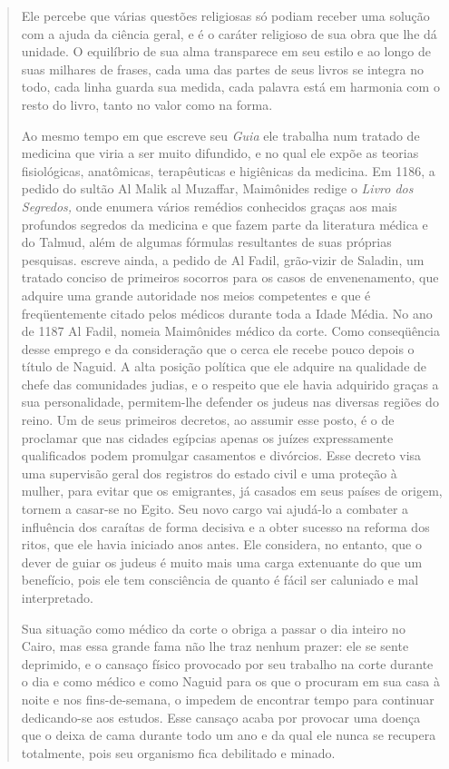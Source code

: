 \begin{quote}
Ele percebe que várias questões religiosas só podiam receber uma solução
com a ajuda da ciência geral, e é o caráter religioso de sua obra que
lhe dá unidade. O equilíbrio de sua alma transparece em seu estilo e ao
longo de suas milhares de frases, cada uma das partes de seus livros se
integra no to­do, cada linha guarda sua medida, cada palavra está em
harmonia com o resto do livro, tanto no valor como na forma.

Ao mesmo tempo em que escreve seu \emph{Guia} ele trabalha num trata­do
de medicina que viria a ser muito difundido, e no qual ele expõe as
teorias fisiológicas, anatômicas, terapêuticas e higiênicas da medicina.
Em 1186, a pe­dido do sultão Al Malik al Muzaffar, Maimônides redige o
\emph{Livro dos Segredos,} onde enumera vários remédios conhecidos
graças aos mais profundos segre­dos da medicina e que fazem parte da
literatura médica e do Talmud, além de algumas fórmulas resultantes de
suas próprias pesquisas. escreve ainda, a pedi­do de Al Fadil,
grão-vizir de Saladin, um tratado conciso de primeiros socorros para os
casos de envenenamento, que adquire uma grande autoridade nos meios
competentes e que é freqüentemente citado pelos médicos durante toda a
Ida­de Média.
No ano de 1187 Al Fadil, nomeia Maimônides médico da corte. Co­mo
conseqüência desse emprego e da consideração que o cerca ele recebe
pouco depois o título de Naguid. A alta posição política que ele adquire
na qualidade de chefe das comunidades judias, e o respeito que ele havia
adquirido graças a sua personalidade, permitem-lhe defender os judeus
nas diversas regiões do reino. Um de seus primeiros decretos, ao assumir
esse posto, é o de proclamar que nas cidades egípcias apenas os juízes
expressamente qualificados podem promulgar casamentos e divórcios. Esse
decreto visa uma supervisão geral dos registros do estado civil e uma
proteção à mulher, para evitar que os emigran­tes, já casados em seus
países de origem, tornem a casar-se no Egito. Seu novo cargo vai
ajudá-lo a combater a influência dos caraítas de forma decisiva e a
obter sucesso na reforma dos ritos, que ele havia iniciado anos antes.
Ele consi­dera, no entanto, que o dever de guiar os judeus é muito mais
uma carga exte­nuante do que um benefício, pois ele tem consciência de
quanto é fácil ser ca­luniado e mal interpretado.

Sua situação como médico da corte o obriga a passar o dia inteiro no
Cairo, mas essa grande fama não lhe traz nenhum prazer: ele se sente
depri­mido, e o cansaço físico provocado por seu trabalho na corte
durante o dia e como médico e como Naguid para os que o procuram em sua
casa à noite e nos fins-de-semana, o impedem de encontrar tempo para
continuar dedican­do-se aos estudos. Esse cansaço acaba por provocar uma
doença que o deixa de cama durante todo um ano e da qual ele nunca se
recupera totalmente, pois seu organismo fica debilitado e minado.


\end{quote}
